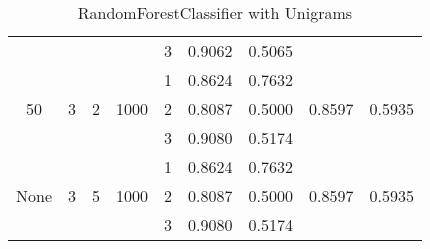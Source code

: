 \documentclass[12pt, twoside]{article}
\begin{document}
\begin{landscape}
\begin{table}[!htbp]
\begin{tabular}{ccccccccc}
  	&	&	&	&	3	&	0.9062	&	0.5065	&		&	 \\
  	\cmidrule(r){5-9}
  	&	&	&	&	1	&	0.8624		&	0.7632	&		&	 \\
  50	&	3	&	2	&	1000	&	2	&	0.8087	&	0.5000	&	0.8597	&	0.5935 \\
  	&	&	&	&	3	&	0.9080	&	0.5174	&		&	 \\
  	\cmidrule(r){5-9}
  	&	&	&	&	1	&	0.8624	&	0.7632	&		&	 \\
  None	&	3	&	5	&	1000	&	2	&	0.8087	&	0.5000	&	0.8597	&	0.5935 \\
  	&	&	&	&	3	&	0.9080	&	0.5174	&		&	 \\
  \bottomrule
  \end{tabular}
  \caption{RandomForestClassifier with Unigrams}
\end{table}
\end{landscape}

\newpage
\end{document}
